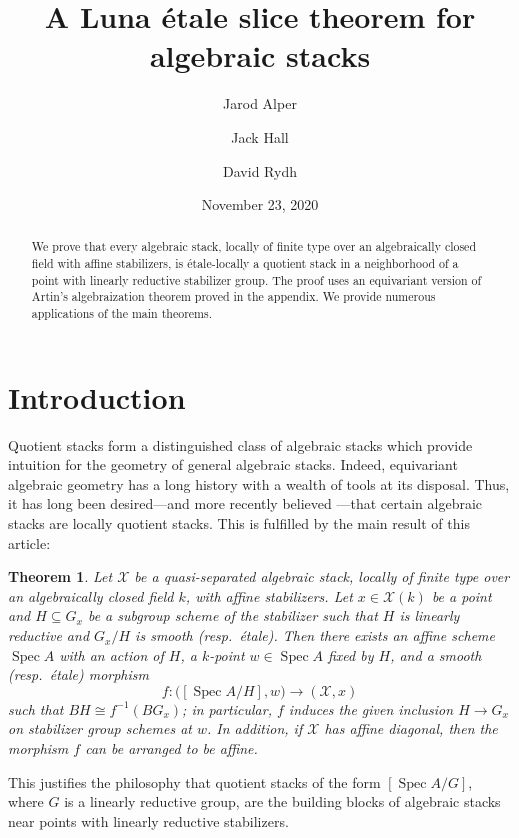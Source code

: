 \documentclass[a4paper]{amsart}
\title{A Luna \'etale slice theorem for algebraic stacks}
\author[J.~Alper]{Jarod Alper}
\author[J.~Hall]{Jack Hall}
\author[D.~Rydh]{David Rydh}
\date{November 23, 2020}
\theoremstyle{plain}
\newtheorem{theorem}{Theorem}[section]
\theoremstyle{definition}
\theoremstyle{remark}
\numberwithin{equation}{section}
\newcommand\cX{\mathcal{X}}
\DeclareMathOperator{\Spec}{Spec}
\begin{document}
\setcounter{tocdepth}{1}
\begin{abstract} We prove that every algebraic stack, locally of finite type over an algebraically closed field with affine stabilizers, is \'etale-locally a quotient stack in a neighborhood of a point with linearly reductive stabilizer group.  The proof uses an equivariant version of Artin's algebraization theorem proved in the appendix.   We provide numerous applications of the main theorems.
\end{abstract}
\maketitle
\section{Introduction}

Quotient stacks form a distinguished class of algebraic stacks which provide intuition for 
the geometry of general algebraic stacks. Indeed, equivariant algebraic geometry has a 
long history with a wealth of tools at its disposal. Thus, it has long been desired---and 
more recently believed \cite{alper-quotient,alper-kresch}---that certain algebraic 
stacks are locally quotient stacks. This is fulfilled by the main result of this article: 



\begin{theorem}\label{T:field}
Let $\cX$ be a quasi-separated algebraic stack, locally 
of finite type over an algebraically closed field $k$, with affine stabilizers.  Let $x \in \cX(k)$ be a point and $H \subseteq G_x$ be a subgroup scheme of the stabilizer such that $H$ is linearly reductive and $G_x / H$ is smooth (resp.\ \'etale).  Then there exists an affine scheme $\Spec A$ with an action of $H$, a $k$-point $w \in \Spec A$ fixed by $H$, and a smooth (resp.\ \'etale) morphism
$$f\colon \bigl([\Spec A/H],w\bigr) \to (\cX,x)$$
such that $BH \cong f^{-1}(BG_x)$;  in particular, $f$ induces the given inclusion $H \to G_x$ on stabilizer group schemes at $w$. In addition, if $\cX$ has affine diagonal, then the morphism $f$ can be arranged to be affine.
\end{theorem}

This justifies the philosophy that quotient stacks of 
the form $[\Spec A / G]$, where $G$ is a linearly reductive group, are the building blocks
 of algebraic stacks near points with linearly reductive stabilizers. 
 
\end{document}
